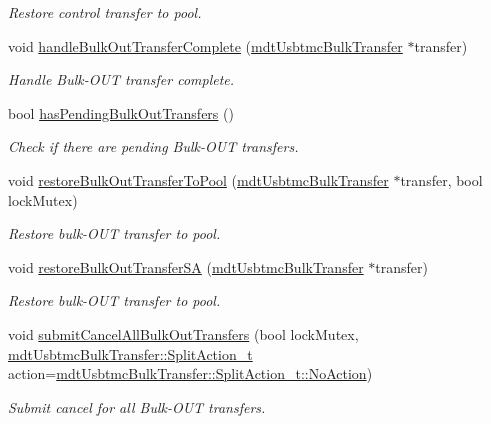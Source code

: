 \begin{DoxyCompactItemize}
\begin{DoxyCompactList}\small\item\em Restore control transfer to pool. \end{DoxyCompactList}\item 
void \hyperlink{classmdt_usbtmc_transfer_handler_a1634648e3cb884b36fb9bb8cd47bbacb}{handle\-Bulk\-Out\-Transfer\-Complete} (\hyperlink{classmdt_usbtmc_bulk_transfer}{mdt\-Usbtmc\-Bulk\-Transfer} $\ast$transfer)
\begin{DoxyCompactList}\small\item\em Handle Bulk-\/\-O\-U\-T transfer complete. \end{DoxyCompactList}\item 
bool \hyperlink{classmdt_usbtmc_transfer_handler_a87a2bb97c0c18b1e8ea536a461f005cb}{has\-Pending\-Bulk\-Out\-Transfers} ()
\begin{DoxyCompactList}\small\item\em Check if there are pending Bulk-\/\-O\-U\-T transfers. \end{DoxyCompactList}\item 
void \hyperlink{classmdt_usbtmc_transfer_handler_a8094e085ba7e4f1d980c0b4a62e9310d}{restore\-Bulk\-Out\-Transfer\-To\-Pool} (\hyperlink{classmdt_usbtmc_bulk_transfer}{mdt\-Usbtmc\-Bulk\-Transfer} $\ast$transfer, bool lock\-Mutex)
\begin{DoxyCompactList}\small\item\em Restore bulk-\/\-O\-U\-T transfer to pool. \end{DoxyCompactList}\item 
void \hyperlink{classmdt_usbtmc_transfer_handler_a820945eef7e22749968fc341297330f9}{restore\-Bulk\-Out\-Transfer\-S\-A} (\hyperlink{classmdt_usbtmc_bulk_transfer}{mdt\-Usbtmc\-Bulk\-Transfer} $\ast$transfer)
\begin{DoxyCompactList}\small\item\em Restore bulk-\/\-O\-U\-T transfer to pool. \end{DoxyCompactList}\item 
void \hyperlink{classmdt_usbtmc_transfer_handler_adeceafc13317c0a7c813a162a18b763a}{submit\-Cancel\-All\-Bulk\-Out\-Transfers} (bool lock\-Mutex, \hyperlink{classmdt_usbtmc_bulk_transfer_a81f2309d821053cd7c8f6e32aff93b7c}{mdt\-Usbtmc\-Bulk\-Transfer\-::\-Split\-Action\-\_\-t} action=\hyperlink{classmdt_usbtmc_bulk_transfer_a81f2309d821053cd7c8f6e32aff93b7ca1e601ea653db1c729c9ee5746730fabe}{mdt\-Usbtmc\-Bulk\-Transfer\-::\-Split\-Action\-\_\-t\-::\-No\-Action})
\begin{DoxyCompactList}\small\item\em Submit cancel for all Bulk-\/\-O\-U\-T transfers. \end{DoxyCompactList}\item 

\end{DoxyCompactItemize}
